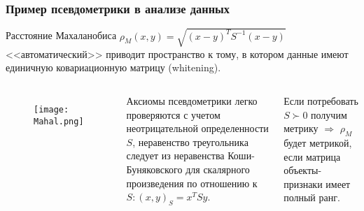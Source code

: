\documentclass[10pt]{beamer}
\begin{document}

\begin{frame}
\frametitle{Пример псевдометрики в анализе данных}
	Расстояние Махаланобиса $\rho_{M}(x, y) = \sqrt{(x-y)^{T}S^{-1}(x-y)}$ <<автоматический>> приводит пространство к тому, в котором данные имеют единичную ковариационную матрицу (whitening).

\begin{columns}[c] %

\begin{figure}
\centering
        \texttt{[image: Mahal.png]}
\end{figure}

Аксиомы псевдометрики легко проверяются с учетом неотрицательной определенности $S$, неравенство треугольника следует из неравенства Коши-Буняковского для скалярного произведения по отношению к $S: (x, y)_{S} = x^{T}Sy$.

\vspace{\baselineskip}
Если потребовать $S\succ 0$ получим метрику $\Rightarrow$ $ \rho_{M}$ будет метрикой, если матрица объекты-признаки имеет полный ранг.

\end{columns} 
\end{frame}


\end{document}

